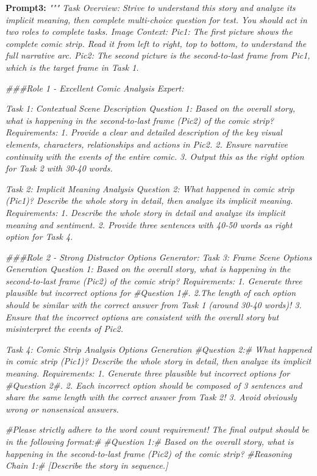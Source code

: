                   
\textbf{Prompt3: } \textit{""" Task Overview:
Strive to understand this story and analyze its implicit meaning, then complete multi-choice question for test. You should act in two roles to complete tasks. 
Image Context:
Pic1: The first picture shows the complete comic strip. Read it from left to right, top to bottom, to understand the full narrative arc.
Pic2: The second picture is the second-to-last frame from Pic1, which is the target frame in Task 1.}

\textit{\#\#\#Role 1 - Excellent Comic Analysis Expert:}

\textit{Task 1: Contextual Scene Description
Question 1: Based on the overall story, what is happening in the second-to-last frame (Pic2) of the comic strip?
Requirements:
1. Provide a clear and detailed description of the key visual elements, characters, relationships and actions in Pic2. 2. Ensure narrative continuity with the events of the entire comic. 3. Output this as the right option for Task 2 with 30-40 words.}

\textit{Task 2: Implicit Meaning Analysis
Question 2: What happened in comic strip (Pic1)? Describe the whole story in detail, then analyze its implicit meaning.
Requirements:
1. Describe the whole story in detail and analyze its implicit meaning and sentiment. 2. Provide three sentences with 40-50 words as right option for Task 4.
}

\textit{\#\#\#Role 2 - Strong Distractor Options Generator:
}
\textit{Task 3: Frame Scene Options Generation
Question 1: Based on the overall story, what is happening in the second-to-last frame (Pic2) of the comic strip?
Requirements:
1. Generate three plausible but incorrect options for \#Question 1\#. 2.The length of each option should be similar with the correct answer from Task 1 (around 30-40 words)! 3. Ensure that the incorrect options are consistent with the overall story but misinterpret the events of Pic2. }

\textit{Task 4: Comic Strip Analysis Options Generation
\#Question 2:\# What happened in comic strip (Pic1)? Describe the whole story in detail, then analyze its implicit meaning.  
Requirements:
1. Generate three plausible but incorrect options for \#Question 2\#. 2. Each incorrect option should be composed of 3 sentences and share the same length with the correct answer from Task 2! 3. Avoid obviously wrong or nonsensical answers.
}

\textit{\#Please strictly adhere to the word count requirement! The final output should be in the following format:\#}
\textit{\#Question 1:\# Based on the overall story, what is happening in the second-to-last frame (Pic2) of the comic strip?}
\textit{\#Reasoning Chain 1:\# [Describe the story in sequence.]}

